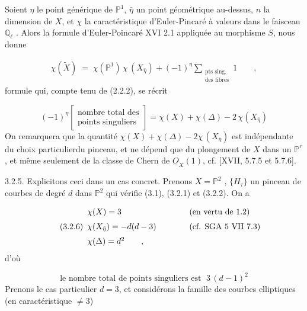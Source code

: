 Soient $\eta$ le point générique de $\mathbb{P}^1$, $\bar{\eta}$ un point géométrique au-dessus, $n$ la dimension de $X$, et $\chi$ la caractéristique d'Euler-Pincaré à valeurs dans le faisceau $\mathbb{Q}_\ell$ . Alors la formule d'Euler-Poincaré XVI 2.1 appliquée au morphisme $S$, nous donne

\begin{multline}\tag{3.2.3}
\chi(\widetilde{X}) \;=\; \chi(\mathbb{P}^1)\, \chi\,(X_{\bar{\eta}}) + (-1)^{\eta} \sum_{\substack{\text{pts sing.}\\ \text{des fibres}}} 1 \qquad ,
\end{multline}
formule qui, compte tenu de (2.2.2), se récrit

\begin{equation}\tag{3.2.4}
(-1)^{\eta} \left[\begin{array}{c} \text{nombre total des} \\[4pt] \text{points singuliers} \end{array}\right] = \chi(X) + \chi(\Delta) - 2\,\chi(X_{\bar{\eta}})
\end{equation}
On remarquera que la quantité $\chi(X) + \chi(\Delta) - 2\chi\,(X_{\bar{\eta}})$ est indépendante du choix particulierdu pinceau, et ne dépend que du plongement de $X$ dans un $\mathbb{P}^r$, et même seulement de la classe de Chern de $\underline{O}_X(1)$, cf. [XVII, 5.7.5 et 5.7.6].



3.2.5. Explicitons ceci dans un cas concret. Prenons $X = \mathbb{P}^2$ , $\{H_\tau\}$ un pinceau de courbes de degré $d$ dans $\mathbb{P}^2$ qui vérifie (3.1), (3.2.1) et (3.2.2). On a

\begin{equation}\tag{3.2.6}
\begin{array}{l@{\qquad\qquad}l} \chi(X) = 3 & (\text{en vertu de 1.2}) \\[6pt] \chi(X_{\bar{\eta}}) = -d(d-3) & (\text{cf. SGA 5 VII 7.3}) \\[6pt] \chi(\Delta) = d^2 \qquad , & \end{array}
\end{equation}
d'où

\begin{equation}\tag{3.2.7}
\text{le nombre total de points singuliers est } \; 3\,(d-1)^2
\end{equation}
Prenons le cas particulier $d = 3$, et considérons la famille des courbes elliptiques (en caractéristique $\neq 3$)

